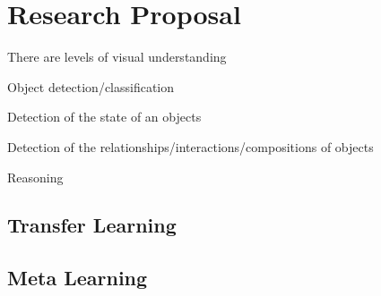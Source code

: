 \chapter{Research Proposal}

There are levels of visual understanding
\begin{enumerate}
	{\item \color{Green} Object detection/classification}
	\item Detection of the state of an objects
	\item Detection of the relationships/interactions/compositions of objects
	\item Reasoning
\end{enumerate}

\section{Transfer Learning}

\section{Meta Learning}